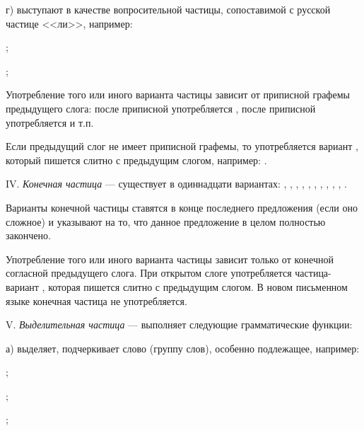 г) выступают в качестве вопросительной частицы, сопоставимой с русской частице <<ли>>, например:
\begin{prfsample}
	\item {};
	\item {};
\end{prfsample}

Употребление того или иного варианта частицы зависит от приписной графемы предыдущего слога: после приписной  употребляется , после приписной  употребляется  и т.п.

Если предыдущий слог не имеет приписной графемы, то употребляется вариант , который пишется слитно с предыдущим слогом, например: .

IV.	\emph{Конечная частица} --- существует в одиннадцати вариантах:
, , ,
, , ,
, , ,
, .

Варианты конечной частицы ставятся в конце последнего предложения (если оно сложное) и указывают на то, что данное предложение в целом полностью закончено.

Употребление того или иного варианта частицы зависит только от конечной согласной предыдущего слога. При открытом слоге употребляется частица-вариант , которая пишется слитно с предыдущим слогом. В новом письменном языке конечная частица не употребляется.

V. \emph{Выделительная частица}  --- выполняет следующие грамматические функции:

а) выделяет, подчеркивает слово (группу слов), особенно подлежащее, например:
\begin{prfsample}
	\item {};
	\item {};
	\item {};
\end{prfsample}

